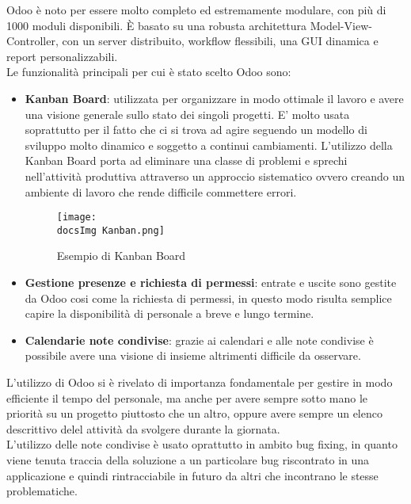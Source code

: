 Odoo è noto per essere molto completo ed estremamente modulare, con più di 1000 moduli disponibili. È basato su una robusta architettura Model-View-Controller, con un server distribuito, workflow flessibili, una GUI dinamica e report personalizzabili.
\\
Le funzionalit\`a principali per cui \`e stato scelto Odoo sono:

\begin{itemize}
	\item \textbf{Kanban Board}: utilizzata per organizzare in modo ottimale il lavoro e avere una visione generale sullo stato dei singoli progetti. E' molto usata soprattutto per il fatto che ci si trova ad agire seguendo un modello di sviluppo molto dinamico e soggetto a continui cambiamenti. L'utilizzo della Kanban Board porta ad eliminare una classe di problemi e sprechi nell'attivit\`a produttiva attraverso un approccio sistematico ovvero creando un ambiente di lavoro che rende difficile commettere errori.
	
	\begin{figure}[H]
		\centering
		\texttt{[image: \\docsImg Kanban.png]}
		\caption{Esempio di Kanban Board}
		\label{fig:Esempio di Kanban Board}
	\end{figure}
	
	\item \textbf{Gestione presenze e richiesta di permessi}: entrate e uscite sono gestite da Odoo cosi come la richiesta di permessi, in questo modo risulta semplice capire la disponibilit\`a di personale a breve e lungo termine.
	
	\item \textbf{Calendarie note condivise}: grazie ai calendari e alle note condivise \`e possibile avere una visione di insieme altrimenti difficile da osservare.	

\end{itemize}

L'utilizzo di Odoo si \`e rivelato di importanza fondamentale per gestire in modo efficiente il tempo del personale, ma anche per avere sempre sotto mano le priorit\`a su un progetto piuttosto che un altro, oppure avere sempre un elenco descrittivo delel attivit\`a da svolgere durante la giornata.
\\
L'utilizzo delle note condivise \`e usato oprattutto in ambito bug fixing, in quanto viene tenuta traccia della soluzione a un particolare bug riscontrato in una applicazione e quindi rintracciabile in futuro da altri che incontrano le stesse problematiche.

